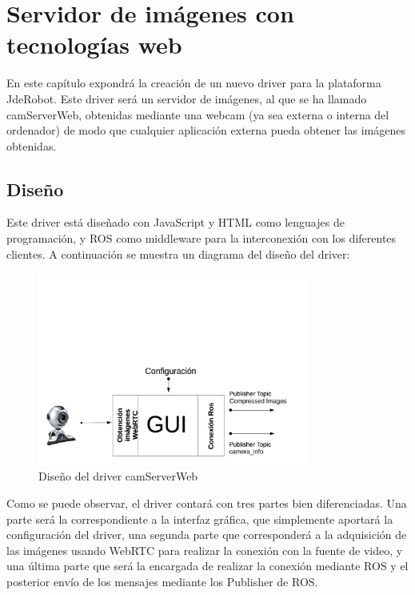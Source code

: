 \chapter{Servidor de imágenes con tecnologías web }\label{cap.camserver}
En este capítulo expondrá la creación de un nuevo driver para la plataforma JdeRobot. Este driver será un servidor de imágenes, al que se ha llamado camServerWeb, obtenidas mediante una webcam (ya sea externa o interna del ordenador) de modo que cualquier aplicación externa pueda obtener las imágenes obtenidas.
\section{Diseño}
Este driver está diseñado con JavaScript y HTML como lenguajes de programación, y ROS como middleware para la interconexión con los diferentes clientes. A continuación se muestra un diagrama del diseño del driver:
\begin{figure}[H]
  \begin{center}
    \includegraphics[width=0.8\textwidth]{figures/disenocamserver.png}
		\caption{Diseño del driver camServerWeb}
		\label{fig.diseñocamserver}
		\end{center}
\end{figure}
Como se puede observar, el driver contará con tres partes bien diferenciadas. Una parte será la correspondiente a la interfaz gráfica, que simplemente aportará la configuración del driver, una segunda parte que corresponderá a la adquisición de las imágenes usando WebRTC para realizar la conexión con la fuente de video, y una última parte que será la encargada de realizar la conexión mediante ROS y el posterior envío de los mensajes mediante los Publisher de ROS.

